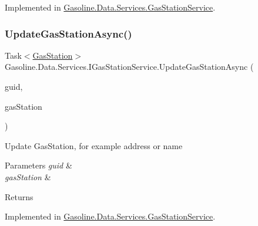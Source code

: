 Implemented in \mbox{\hyperlink{class_gasoline_1_1_data_1_1_services_1_1_gas_station_service_a74d212652b5b4d79bae715b9e2ac8034}{Gasoline.\+Data.\+Services.\+Gas\+Station\+Service}}.

\mbox{\label{interface_gasoline_1_1_data_1_1_services_1_1_i_gas_station_service_ae172cf0f9448fd6c9d24c2ced6b1afdc}} 
\subsubsection{\texorpdfstring{UpdateGasStationAsync()}{UpdateGasStationAsync()}}
{\footnotesize\ttfamily Task$<$\mbox{\hyperlink{class_gasoline_1_1_data_1_1_models_1_1_gas_station}{Gas\+Station}}$>$ Gasoline.\+Data.\+Services.\+I\+Gas\+Station\+Service.\+Update\+Gas\+Station\+Async (\begin{DoxyParamCaption}\item[{Guid}]{guid,  }\item[{\mbox{\hyperlink{class_gasoline_1_1_data_1_1_models_1_1_gas_station}{Gas\+Station}}}]{gas\+Station }\end{DoxyParamCaption})}



Update Gas\+Station, for example address or name 


\begin{DoxyParams}{Parameters}
{\em guid} & \\
\hline
{\em gas\+Station} & \\
\hline
\end{DoxyParams}
\begin{DoxyReturn}{Returns}

\end{DoxyReturn}


Implemented in \mbox{\hyperlink{class_gasoline_1_1_data_1_1_services_1_1_gas_station_service_a71d61038244d2ebd2543e76073c7ac91}{Gasoline.\+Data.\+Services.\+Gas\+Station\+Service}}.

\mbox{\label{interface_gasoline_1_1_data_1_1_services_1_1_i_gas_station_service_a88e35520ad60feb8c04c609a47c064ff}} 
